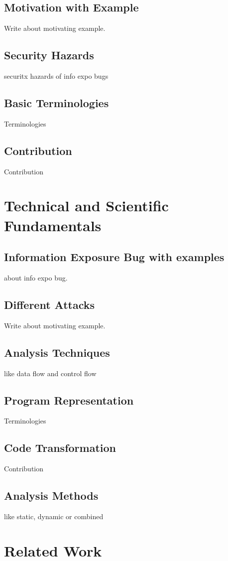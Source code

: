  \section{Motivation with Example}
Write about motivating example.

\section{Security Hazards}
securitx hazards of info expo bugs
 
\section{Basic Terminologies}
Terminologies

\section{Contribution}
Contribution


\chapter{Technical and Scientific Fundamentals}
\label{chapter:Technical}

\section{Information Exposure Bug with examples}
about info expo bug.
 
 \section{Different Attacks}
Write about motivating example.

\section{Analysis Techniques}
like data flow and control flow

\section{Program Representation}
Terminologies

\section{Code Transformation}
Contribution

\section{Analysis Methods}
like static, dynamic or combined

\chapter{Related Work}
\label{chapter:related}